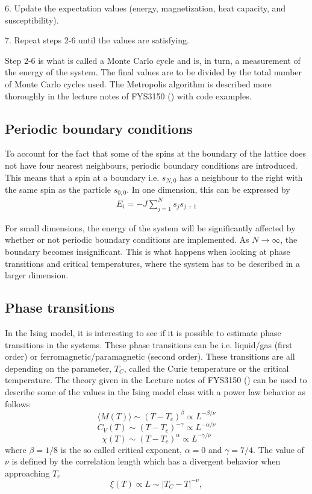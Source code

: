 \documentclass[12pt,english,a4paper]{article}
\begin{document}
6. Update the expectation values (energy, magnetization, heat capacity, and susceptibility).

7. Repeat steps 2-6 until the values are satisfying.


\noindent Step 2-6 is what is called a Monte Carlo cycle and is, in turn, a measurement of the energy of the system. The final values are to be divided by the total number of Monte Carlo cycles used. The Metropolis algorithm is described more thoroughly in the lecture notes of FYS3150 (\cite{LectureIsing}) with code examples.

\subsection{Periodic boundary conditions}
To account for the fact that some of the spins at the boundary of the lattice does not have four nearest neighbours, periodic boundary conditions are introduced. This means that a spin at a boundary i.e. $s_{N,0}$ has a neighbour to the right with the same spin as the particle $s_{0,0}$. In one dimension, this can be expressed by
\begin{align*}
    E_i=-J\sum_{j=1}^{N}s_js_{j+1}
\end{align*}

\noindent For small dimensions, the energy of the system will be significantly affected by whether or not periodic boundary conditions are implemented. As $N \rightarrow \infty$, the boundary becomes insignificant. This is what happens when looking at phase transitions and critical temperatures, where the system has to be described in a larger dimension.

\subsection{Phase transitions}
In the Ising model, it is interesting to see if it is possible to estimate phase transitions in the systems. These phase transitions can be i.e. liquid/gas (first order) or ferromagnetic/paramagnetic (second order). These transitions are all depending on the parameter, $T_C$, called the Curie temperature or the critical temperature. The theory given in the Lecture notes of FYS3150 (\cite{LectureIsing}) can be used to describe some of the values in the Ising model class with a power law behavior as follows
\begin{equation}
    \langle M(T)\rangle\sim (T-T_c)^\beta \propto L^{-\beta/\nu}
\end{equation}
\begin{equation}
    C_V(T)\sim (T-T_c)^{-\gamma} \propto L^{-\alpha/\nu}
\end{equation}
\begin{equation}
    \chi(T)\sim (T-T_c)^\alpha \propto L^{-\gamma/\nu}
\end{equation}
where $\beta = 1/8$ is the so called critical exponent, $\alpha = 0$ and $\gamma = 7/4$. The value of $\nu$ is defined by the correlation length which has a divergent behavior when approaching $T_c$
\begin{equation}
      \xi(T) \propto L \sim \left|T_C-T\right|^{-\nu},
  \label{eq:xi}
\end{equation}
\end{document}
